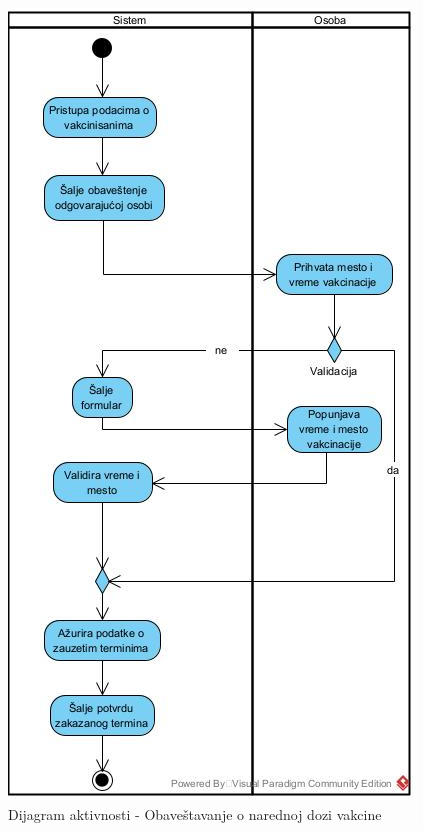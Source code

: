 \documentclass[titlepage]{article}
\begin{document}
\begin{figure}[H]
\centering
\includegraphics[scale=0.8]{Vakcinacija_drugom_dozom}
\caption{Dijagram aktivnosti - Obaveštavanje o narednoj dozi vakcine}
\end{figure}
\end{document}
